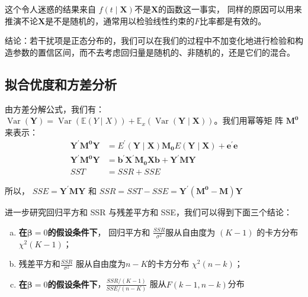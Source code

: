 这个令人迷惑的结果来自 $ f(t \mid \boldsymbol{X}) $不是$ \boldsymbol{X} $的函数这一事实，
同样的原因可以用来推演不论$ \boldsymbol{X} $是不是随机的，通常用以检验线性约束的$ F $比率都是有效的。

{\heiti 结论：若干扰项是正态分布的，我们可以在我们的过程中不加变化地进行检验和构造参数的置信区间，而不去考虑回归量是随机的、非随机的，还是它们的混合。}

\subsection{拟合优度和方差分析}
由方差分解公式，我们有：  $ \operatorname{Var}(\boldsymbol{Y})=\operatorname{Var}(\mathbb{E}(Y \mid X))+             
                        \mathbb{E}_{x}(\operatorname{Var}(\boldsymbol{Y \mid X})) $。我们用幂等矩
阵 $ \boldsymbol{M^{0}} $ 来表示：
$$ \begin{aligned}
    \boldsymbol{Y^{\prime} M^{0} Y} & = E^{\prime}(\boldsymbol{Y \mid X}) \boldsymbol{M_{0}} E(\boldsymbol{Y \mid X})+\boldsymbol{e^{\prime} e} \\
    \boldsymbol{Y^{\prime} M^{0} Y} & = \boldsymbol{b^{\prime} X^{\prime} M_{0} X b+Y^{\prime} M Y} \\
    S S T & = S S R+S S E
  \end{aligned} $$

  所以， $ SSE = \boldsymbol{Y^{\prime} M Y} $ 和 $ SSR = SST − SSE = \boldsymbol{Y^{\prime}(M^{0} − M )Y}$

  进一步研究回归平方和 SSR 与残差平方和 SSE，我们可以得到下面三个结论：
  \begin{enumerate}[a)]
      \item{ \bf 在$ \boldsymbol{\beta}  =0 $的假设条件下}， 回归平方和 $ \frac{SSR}{\sigma^{2}} $服从自由度为 $ (K-1) $ 的卡方分布$ \chi^{2}(K-1) $；
      \item 残差平方和$ \frac{SSR}{\sigma^{2}} $ 服从自由度为$ n - K $的卡方分布 $ \chi^{2}(n-k) $；
      \item{ \bf 在$ \boldsymbol{\beta}  =0 $的假设条件下}，$ \frac {SSR/(K-1)} {SSE/(n-K)} $ 服从$ F(k-1,n-k)$分布
  \end{enumerate}

